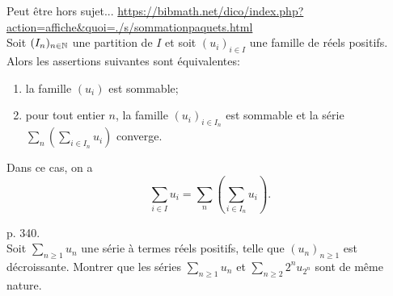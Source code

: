 \begin{theo}
    Peut être hors sujet...
    \url{https://bibmath.net/dico/index.php?action=affiche&quoi=./s/sommationpaquets.html} \\
    Soit $(I_n)_{n \in \mathbb{N}}$ une partition de $I$ et soit $(u_i)_{i \in I}$ une famille de réels positifs. Alors les assertions suivantes sont équivalentes:
    \begin{enumerate}
        \item la famille $(u_i)$ est sommable;
        \item pour tout entier $n$, la famille $(u_i)_{i \in I_n}$ est sommable et la série $\sum\limits_n \left ( \sum\limits_{i \in I_n} u_i \right)$ converge.
    \end{enumerate}
    Dans ce cas, on a
    $$\sum_{i \in I} u_i = \sum_n \left( \sum_{i \in I_n} u_i \right).$$
\end{theo}

\begin{exercice}
    \cite{exos_oraux} p. 340. \\
    Soit $\sum\limits_{n \geqslant 1} u_n$ une série à termes réels positifs, telle que $(u_n)_{n \geqslant 1}$ est décroissante. Montrer que les séries $\sum\limits_{n \geqslant 1} u_n$ et $\sum\limits_{n \geqslant 2} 2^n u_{2^n}$ sont de même nature. 
\end{exercice}